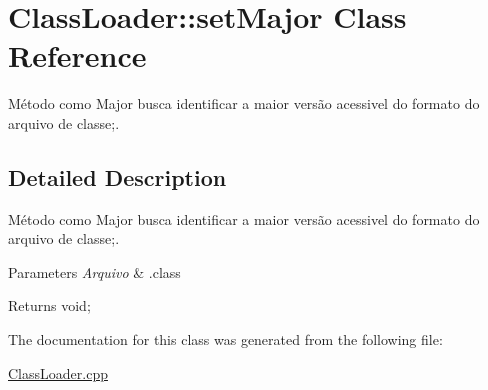 \hypertarget{class_class_loader_1_1set_major}{}\section{Class\+Loader\+:\+:set\+Major Class Reference}
\label{class_class_loader_1_1set_major}


Método como Major busca identificar a maior versão acessivel do formato do arquivo de classe;.  




\subsection{Detailed Description}
Método como Major busca identificar a maior versão acessivel do formato do arquivo de classe;. 


\begin{DoxyParams}{Parameters}
{\em Arquivo} & .class \\
\hline
\end{DoxyParams}
\begin{DoxyReturn}{Returns}
void; 
\end{DoxyReturn}


The documentation for this class was generated from the following file\+:\begin{DoxyCompactItemize}
\item 
\hyperlink{_class_loader_8cpp}{Class\+Loader.\+cpp}\end{DoxyCompactItemize}

